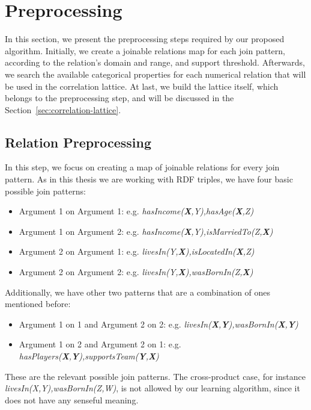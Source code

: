 \section{Preprocessing}

In this section, we present the preprocessing steps required by our proposed algorithm. Initially, we create a joinable
relations map for each join pattern, according to the relation's domain and range, and support threshold.
Afterwards, we search the available categorical properties for each numerical relation that
will be used in the correlation lattice. At last, we build the lattice itself, which belongs to the preprocessing step,
and will be discussed in the Section~\ref{sec:correlation-lattice}.                                              
        
\subsection{Relation Preprocessing}

In this step, we focus on creating a map of joinable relations for every join pattern. As in this thesis we
are working with RDF triples, we have four basic possible join patterns:

\begin{itemize}
 \item Argument 1 on Argument 1: e.g. \emph{hasIncome(\textbf{X},Y),hasAge(\textbf{X},Z)}
 \item Argument 1 on Argument 2: e.g. \emph{hasIncome(\textbf{X},Y),isMarriedTo(Z,\textbf{X})}
 \item Argument 2 on Argument 1: e.g. \emph{livesIn(Y,\textbf{X}),isLocatedIn(\textbf{X},Z)}
 \item Argument 2 on Argument 2: e.g. \emph{livesIn(Y,\textbf{X}),wasBornIn(Z,\textbf{X})}
\end{itemize}

Additionally, we have other two patterns that are a combination of ones mentioned before:

\begin{itemize}
 \item Argument 1 on 1 and Argument 2 on 2: e.g.
\emph{livesIn(\textbf{X},\textbf{Y}),wasBornIn(\textbf{X},\textbf{Y})}
 \item Argument 1 on 2 and Argument 2 on 1: e.g.
\emph{hasPlayers(\textbf{X},\textbf{Y}),supportsTeam(\textbf{Y},\textbf{X})}
\end{itemize}

These are the relevant possible join patterns. The cross-product case, for instance
\emph{livesIn(X,Y),wasBornIn(Z,W)}, is not allowed by our learning algorithm, since it does not have any senseful
meaning.

